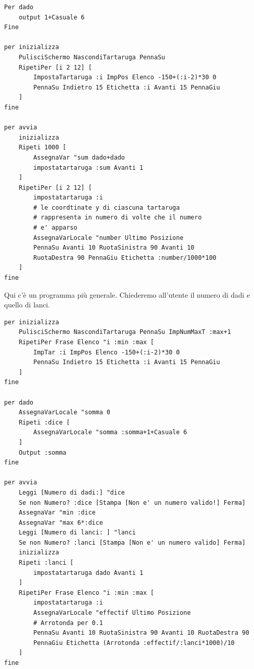 \begin{lstlisting}
Per dado
	output 1+Casuale 6
Fine

per inizializza
	PulisciSchermo NascondiTartaruga PennaSu
	RipetiPer [i 2 12] [ 
		ImpostaTartaruga :i ImpPos Elenco -150+(:i-2)*30 0
		PennaSu Indietro 15 Etichetta :i Avanti 15 PennaGiu 
	]
fine

per avvia
	inizializza
	Ripeti 1000 [
		AssegnaVar "sum dado+dado
		impostatartaruga :sum Avanti 1
	]
	RipetiPer [i 2 12] [
		impostatartaruga :i
		# le coordtinate y di ciascuna tartaruga 
		# rappresenta in numero di volte che il numero
		# e' apparso
		AssegnaVarLocale "number Ultimo Posizione 
		PennaSu Avanti 10 RuotaSinistra 90 Avanti 10 
		RuotaDestra 90 PennaGiu Etichetta :number/1000*100
	]
fine
\end{lstlisting}

Qui c'è un programma più generale. Chiederemo all'utente il numero di dadi e quello di lanci.
\begin{lstlisting}
per inizializza
	PulisciSchermo NascondiTartaruga PennaSu ImpNumMaxT :max+1
	RipetiPer Frase Elenco "i :min :max [ 
		ImpTar :i ImpPos Elenco -150+(:i-2)*30 0
		PennaSu Indietro 15 Etichetta :i Avanti 15 PennaGiu 
	]
fine

per dado
	AssegnaVarLocale "somma 0
	Ripeti :dice [
		AssegnaVarLocale "somma :somma+1+Casuale 6
	]
	Output :somma
fine

per avvia
	Leggi [Numero di dadi:] "dice
	Se non Numero? :dice [Stampa [Non e' un numero valido!] Ferma]
	AssegnaVar "min :dice
	AssegnaVar "max 6*:dice
	Leggi [Numero di lanci: ] "lanci
	Se non Numero? :lanci [Stampa [Non e' un numero valido] Ferma]
	inizializza
	Ripeti :lanci [
		impostatartaruga dado Avanti 1
	]
	RipetiPer Frase Elenco "i :min :max [
		impostatartaruga :i
		AssegnaVarLocale "effectif Ultimo Posizione 
		# Arrotonda per 0.1
		PennaSu Avanti 10 RuotaSinistra 90 Avanti 10 RuotaDestra 90 
		PennaGiu Etichetta (Arrotonda :effectif/:lanci*1000)/10
	]
fine
\end{lstlisting}
